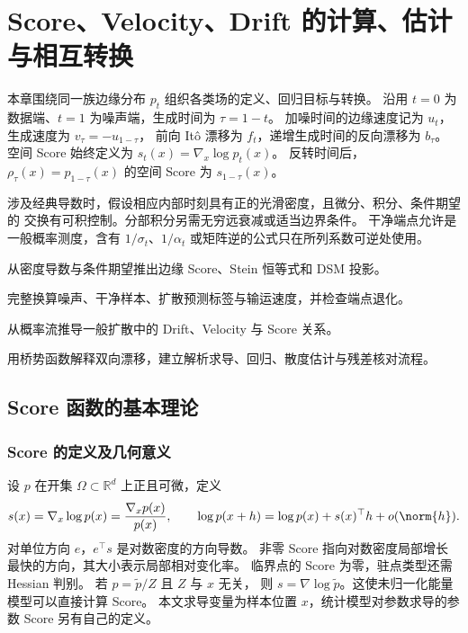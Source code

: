 \chapter{Score、Velocity、Drift 的计算、估计与相互转换}
\label{ch:fields}

本章围绕同一族边缘分布 \(p_t\) 组织各类场的定义、回归目标与转换。
沿用 \(t=0\) 为数据端、\(t=1\) 为噪声端，生成时间为 \(\tau=1-t\)。
加噪时间的边缘速度记为 \(u_t\)，生成速度为 \(v_\tau=-u_{1-\tau}\)，
前向 It\^o 漂移为 \(f_t\)，递增生成时间的反向漂移为 \(b_\tau\)。
空间 Score 始终定义为 \(s_t(x)=\nabla_x\log p_t(x)\)。
反转时间后，\(\rho_\tau(x)=p_{1-\tau}(x)\) 的空间 Score 为 \(s_{1-\tau}(x)\)。

涉及经典导数时，假设相应内部时刻具有正的光滑密度，且微分、积分、条件期望的
交换有可积控制。分部积分另需无穷远衰减或适当边界条件。
干净端点允许是一般概率测度，含有 \(1/\sigma_t\)、\(1/\alpha_t\)
或矩阵逆的公式只在所列系数可逆处使用。

\begin{learningobjectives}
 \item 从密度导数与条件期望推出边缘 Score、Stein 恒等式和 DSM 投影。
 \item 完整换算噪声、干净样本、扩散预测标签与输运速度，并检查端点退化。
 \item 从概率流推导一般扩散中的 Drift、Velocity 与 Score 关系。
 \item 用桥势函数解释双向漂移，建立解析求导、回归、散度估计与残差核对流程。
\end{learningobjectives}

\section{Score 函数的基本理论}
\label{sec:fields-score}

\subsection{Score 的定义及几何意义}

设 \(p\) 在开集 \(\Omega\subset\mathbb R^d\) 上正且可微，定义
\begin{equation}
 s(x)=\nabla_x\log p(x)=\frac{\nabla_xp(x)}{p(x)},\qquad
 \log p(x+h)=\log p(x)+s(x)^\top h+o(\norm{h}).
 \label{eq:fields-score-definition}
\end{equation}
对单位方向 \(e\)，\(e^\top s\) 是对数密度的方向导数。
非零 Score 指向对数密度局部增长最快的方向，其大小表示局部相对变化率。
临界点的 Score 为零，驻点类型还需 Hessian 判别。
若 \(p=\widetilde p/Z\) 且 \(Z\) 与 \(x\) 无关，
则 \(s=\nabla\log\widetilde p\)。这使未归一化能量模型可以直接计算 Score。
本文求导变量为样本位置 \(x\)，统计模型对参数求导的参数 Score 另有自己的定义。

